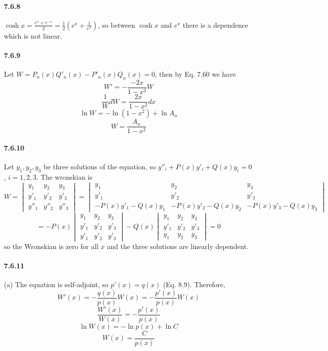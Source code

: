 \documentclass[a4paper]{article}
\begin{document}
\paragraph{7.6.8}
$\cosh x=\frac{e^x+e^{-x}}{2}=\frac{1}{2}(e^x+\frac{1}{e^x})$, so between $\cosh x$ and $e^x$ there is a dependence which is not linear.

\paragraph{7.6.9}
Let $W=P_n(x)Q'_n(x)-P'_n(x)Q_n(x)=0$, then by Eq. 7.60 we have \[W'=-\frac{-2x}{1-x^2}W\]
\[
\frac{1}{W}dW=\frac{2x}{1-x^2}dx
\]
\[
\ln W=-\ln(1-x^2)+\ln A_n
\]
\[
W=\frac{A_n}{1-x^2}
\]

\paragraph{7.6.10}
Let $y_1,y_2,y_3$ be three solutions of the equation, so $y''_i+P(x)y'_i+Q(x)y_i=0$, \;$i=1,2,3$. The wronskian is 
\[
W=\begin{vmatrix}
y_1 & y_2 & y_3 \\
y'_1 & y'_2 & y'_3 \\
y''_1 & y''_2 & y''_3 
\end{vmatrix}=
\begin{vmatrix}
y_1 & y_2 & y_3 \\
y'_1 & y'_2 & y'_3 \\
-P(x)y'_1-Q(x)y_1 & -P(x)y'_2-Q(x)y_2 & -P(x)y'_3-Q(x)y_3 
\end{vmatrix}
\]
\[
=-P(x)\begin{vmatrix}
y_1 & y_2 & y_3 \\
y'_1 & y'_2 & y'_3 \\
y'_1 & y'_2 & y'_3 
\end{vmatrix}-Q(x)
\begin{vmatrix}
y_1 & y_2 & y_3 \\
y'_1 & y'_2 & y'_3 \\
y_1 & y_2 & y_3 
\end{vmatrix}=0
\]
so the Wronskian is zero for all $x$ and the three solutions are linearly dependent.

\paragraph{7.6.11}
(a)
The equation is self-adjoint, so $p'(x)=q(x)$ (Eq. 8.9). Therefore,
\[
W'(x)=-\frac{q(x)}{p(x)}W(x)=-\frac{p'(x)}{p(x)}W(x)
\]
\[
\frac{W'(x)}{W(x)}=-\frac{p'(x)}{p(x)}
\]
\[
\ln W(x)=-\ln p(x)+\ln C
\]
\[
W(x)=\frac{C}{p(x)}
\]
\end{document}

